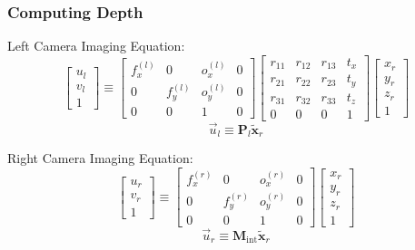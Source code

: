 \begin{frame}
    \frametitle{Computing Depth}
    Left Camera Imaging Equation:
    $$
    \begin{bmatrix} u_l \\ v_l \\ 1 \end{bmatrix} \equiv
    \begin{bmatrix}
        f_x^{(l)} & 0 & o_x^{(l)} & 0 \\
        0 & f_y^{(l)} & o_y^{(l)} & 0 \\
        0 & 0 & 1 & 0
    \end{bmatrix}
    \begin{bmatrix}
        r_{11} & r_{12} & r_{13} & t_x \\
        r_{21} & r_{22} & r_{23} & t_y \\
        r_{31} & r_{32} & r_{33} & t_z \\
        0 & 0 & 0 & 1
    \end{bmatrix}
    \begin{bmatrix} x_r \\ y_r \\ z_r \\ 1 \end{bmatrix}
    $$
    $$\boxed{\vec{u}_l \equiv \mathbf{P}_l \tilde{\mathbf{x}}_r}$$

    Right Camera Imaging Equation:
    $$
    \begin{bmatrix} u_r \\ v_r \\ 1 \end{bmatrix} \equiv
    \begin{bmatrix}
        f_x^{(r)} & 0 & o_x^{(r)} & 0 \\
        0 & f_y^{(r)} & o_y^{(r)} & 0 \\
        0 & 0 & 1 & 0
    \end{bmatrix}
    \begin{bmatrix} x_r \\ y_r \\ z_r \\ 1 \end{bmatrix}
    $$
    $$\boxed{\vec{u}_r \equiv \mathbf{M}_{\text{int}} \tilde{\mathbf{x}}_r}$$
\end{frame}

